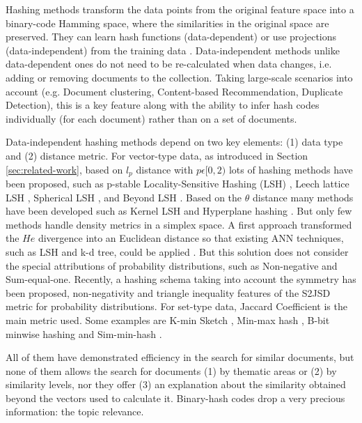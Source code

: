 Hashing methods transform the data points from the original feature space into a binary-code Hamming space, where the similarities in the original space are preserved. They can learn hash functions (data-dependent) or use projections (data-independent) from the training data \cite{Wang2016}. Data-independent methods unlike data-dependent ones do not need to be re-calculated when data changes, i.e. adding or removing documents to the collection. Taking large-scale scenarios into account (e.g. Document clustering, Content-based Recommendation, Duplicate Detection), this is a key feature along with the ability to infer hash codes individually (for each document) rather than on a set of documents. 

Data-independent hashing methods depend on two key elements: (1) data type and (2) distance metric. For vector-type data, as introduced in Section \ref{sec:related-work}, based on $l_p$ distance with $p \epsilon [0,2)$ lots of hashing methods have been proposed, such as p-stable Locality-Sensitive Hashing (LSH) \citep{Datar2004}, Leech lattice LSH \citep{Andoni2006}, Spherical LSH \citep{Terasawa2007}, and Beyond LSH \citep{Andoni2014}. Based on the $\theta$ distance many methods have been developed such as Kernel LSH \citep{Kulis2012} and Hyperplane hashing \citep{Vijayanarasimhan2014}. But only few methods handle density metrics in a simplex space. A first approach transformed the $He$ divergence into an Euclidean distance so that existing ANN techniques, such as LSH and k-d tree, could be applied \citep{Krstovski2013a}. But this solution does not consider the special attributions of probability distributions, such as Non-negative and Sum-equal-one. Recently, a hashing schema \citep{Mao2017} taking into account the symmetry has been proposed, non-negativity and triangle inequality features of the S2JSD metric for probability distributions. For set-type data, Jaccard Coefficient is the main metric used. Some examples are K-min Sketch \citep{Li2012}, Min-max hash \citep{Ji2013}, B-bit minwise hashing \citep{Li2010b} and Sim-min-hash \citep{Zhao2013}.

All of them have demonstrated efficiency in the search for similar documents, but none of them allows the search for documents (1) by thematic areas or (2) by similarity levels, nor they offer (3) an explanation about the similarity obtained beyond the vectors used to calculate it. Binary-hash codes drop a very precious information: the topic relevance.

